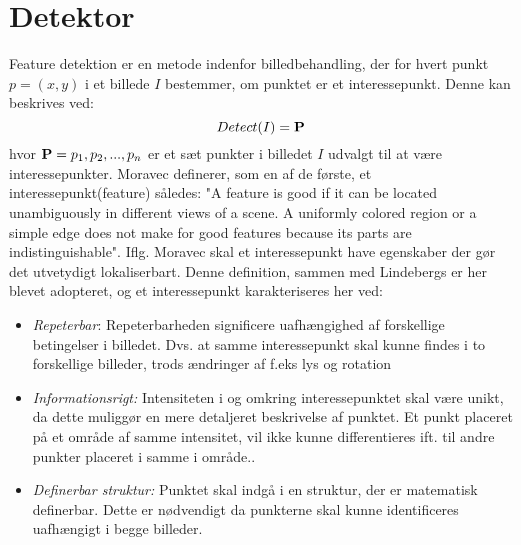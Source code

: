 \section{Detektor}\label{sec:detect}
Feature detektion er en metode indenfor billedbehandling, der for hvert punkt $p = (x,y)$ i et billede $I$ bestemmer, om punktet er et interessepunkt. Denne kan beskrives ved:
\begin{equation}
Detect(I)= \bold{P}
\label{detect}
\end{equation}
hvor $\bold{P} = {p_1, p_2,..., p_n}$ er et sæt punkter i billedet $I$ udvalgt til at være interessepunkter. Moravec \cite{moravec} definerer, som en af de første, et interessepunkt(feature) således: "A
feature is good if it can be located unambiguously in different views of a scene. A
uniformly colored region or a simple edge does not make for good features because
its parts are indistinguishable". Iflg. Moravec skal et interessepunkt have egenskaber der gør det utvetydigt lokaliserbart. Denne definition, sammen med Lindebergs \cite{pointsurvey} er her blevet adopteret, og et interessepunkt karakteriseres her ved:
\begin{itemize}
\item{\emph{Repeterbar}: Repeterbarheden significere uafhængighed af forskellige betingelser i billedet. Dvs. at samme interessepunkt skal kunne findes i to forskellige billeder, trods ændringer af f.eks lys og rotation}
\item{\emph{Informationsrigt:}
Intensiteten i og omkring interessepunktet skal være unikt, da dette muliggør en mere detaljeret beskrivelse af punktet. Et punkt placeret på et område af samme intensitet, vil ikke kunne differentieres ift. til andre punkter placeret i samme i område..}
\item{\textit{Definerbar struktur:} Punktet skal indgå i en struktur, der er matematisk definerbar. Dette er nødvendigt da punkterne skal kunne identificeres uafhængigt i begge billeder.}
\end{itemize}
\raggedbottom
\raggedbottom